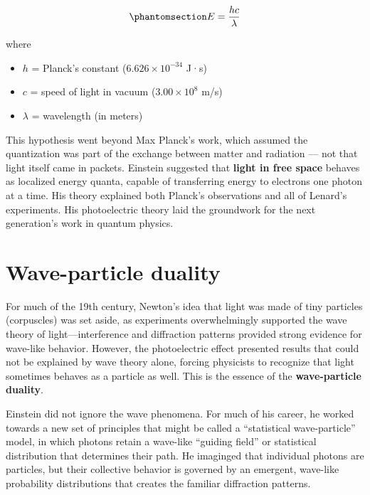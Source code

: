 \documentclass[
  letterpaper,
]{book}
\providecommand{\tightlist}{%
  \setlength{\itemsep}{0pt}\setlength{\parskip}{0pt}}\usepackage{longtable,booktabs,array}
\begin{document}
\begin{equation}\phantomsection\label{eq-plancks-formula}{
E = \frac{h c}{\lambda} 
}\end{equation}

where

\begin{itemize}
\tightlist
\item
  \(h\) = Planck's constant (\(6.626 \times 10^{-34}\) J·s)
\item
  \(c\) = speed of light in vacuum (\(3.00 \times 10^8\) m/s)
\item
  \(\lambda\) = wavelength (in meters)
\end{itemize}

This hypothesis went beyond Max Planck's work, which assumed the
quantization was part of the exchange between matter and radiation ---
not that light itself came in packets. Einstein suggested that
\textbf{light in free space} behaves as localized energy quanta, capable
of transferring energy to electrons one photon at a time. His theory
explained both Planck's observations and all of Lenard's experiments.
His photoelectric theory laid the groundwork for the next generation's
work in quantum physics.

\section{Wave-particle duality}\label{wave-particle-duality}

For much of the 19th century, Newton's idea that light was made of tiny
particles (corpuscles) was set aside, as experiments overwhelmingly
supported the wave theory of light---interference and diffraction
patterns provided strong evidence for wave-like behavior. However, the
photoelectric effect presented results that could not be explained by
wave theory alone, forcing physicists to recognize that light sometimes
behaves as a particle as well. This is the essence of the
\textbf{wave-particle duality}.

Einstein did not ignore the wave phenomena. For much of his career, he
worked towards a new set of principles that might be called a
``statistical wave-particle'' model, in which photons retain a wave-like
``guiding field'' or statistical distribution that determines their
path. He imaginged that individual photons are particles, but their
collective behavior is governed by an emergent, wave-like probability
distributions that creates the familiar diffraction patterns.
\end{document}
